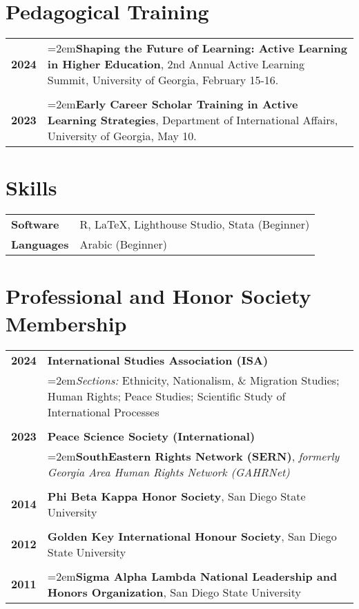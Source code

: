 \documentclass[letterpaper,12pt]{article}
\begin{document}
\section{Pedagogical Training}
\begin{xltabular}{\dimexpr\textwidth-0in}{p{.85in}X}
\textbf{2024} &  \hangindent=2em\textbf{Shaping the Future of Learning: Active Learning in Higher Education}, 2nd Annual Active Learning Summit, University of Georgia, February 15-16.\\ \\
\textbf{2023} &  \hangindent=2em\textbf{Early Career Scholar Training in Active Learning Strategies}, Department of \mbox{International} Affairs, University of Georgia, May 10.
\end{xltabular}

\section{Skills}
\begin{xltabular}{\dimexpr\textwidth-0in}{p{.85in}X}
\textbf{Software} &  R, \LaTeX, Lighthouse Studio, Stata (Beginner)\\
\textbf{Languages} & Arabic (Beginner)
\end{xltabular}

\section{Professional and Honor Society Membership}
\begin{xltabular}{\dimexpr\textwidth-0in}{p{.85in}X}
\textbf{2024} &  \textbf{International Studies Association (ISA)}\\
                     &  \hangindent=2em\textit{Sections:} Ethnicity, Nationalism, \& Migration Studies; Human Rights; Peace Studies; \mbox{Scientific} Study of International Processes\\ \\
\textbf{2023} &  \textbf{Peace Science Society (International)}\\
                     & \hangindent=2em\textbf{SouthEastern Rights Network (SERN)}, \textit{formerly Georgia Area Human Rights Network (GAHRNet)}\\ \\
\textbf{2014} &  \textbf{Phi Beta Kappa Honor Society}, San Diego State University\\ \\
\textbf{2012} &  \textbf{Golden Key International Honour Society}, San Diego State University\\ \\
\textbf{2011} &  \hangindent=2em\textbf{Sigma Alpha Lambda National Leadership and Honors Organization}, San Diego State University
\end{xltabular}
\end{document}

